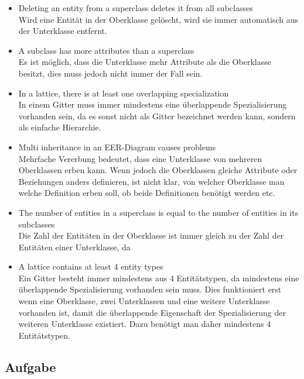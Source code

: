 \documentclass[11pt,a4paper,DIV=9]{scrartcl}
\newcounter{temp}
\newcommand{\aufgabe}[1]{
  \setcounter{temp}{\value{subsection}}
  \setcounter{subsection}{#1}
  \addtocounter{subsection}{-1}
  \subsection{Aufgabe}
  \setcounter{subsection}{\value{temp}}
}
\begin{document}
\begin{itemize}
 \item Deleting an entity from a superclass deletes it from all subclasses
 \\ Wird eine Entit\"at in der Oberklasse gel\"oscht, wird sie immer automatisch aus der Unterklasse entfernt. \\
 \item A subclass has more attributes than a superclass
 \\ Es ist m\"oglich, dass die Unterklasse mehr Attribute als die Oberklasse besitzt, dies muss jedoch nicht immer der Fall sein. \\
 \item In a lattice, there is at least one overlapping specialization
 \\ In einem Gitter muss immer mindestens eine \"uberlappende Spezialisierung vorhanden sein, da es sonst nicht als Gitter bezeichnet werden kann, sondern als einfache Hierarchie. \\
 \item Multi inheritance in an EER-Diagram causes problems
 \\ Mehrfache Vererbung bedeutet, dass eine Unterklasse von mehreren Oberklassen erben kann. Wenn jedoch die Oberklassen gleiche Attribute oder Beziehungen anders definieren, ist nicht klar, von welcher Oberklasse man welche Definition erben soll, ob beide Definitionen ben\"otigt werden etc. \\
 \item The number of entities in a superclass is equal to the number of entities in its subclasses
 \\ Die Zahl der Entit\"aten in der Oberklasse ist immer gleich zu der Zahl der Entit\"aten einer Unterklasse, da
 \item A lattice contains at least 4 entity types
 \\ Ein Gitter besteht immer mindestens aus 4 Entit\"atstypen, da mindestens eine \"uberlappende Spezialisierung vorhanden sein muss. Dies funktioniert erst wenn eine Oberklasse, zwei Unterklassen und eine weitere Unterklasse vorhanden ist, damit die \"uberlappende Eigenschaft der Spezialisierung der weiteren Unterklasse existiert. Dazu ben\"otigt man daher mindestens 4 Entit\"atstypen. \\
\end{itemize}
\aufgabe{4}
\end{document}
